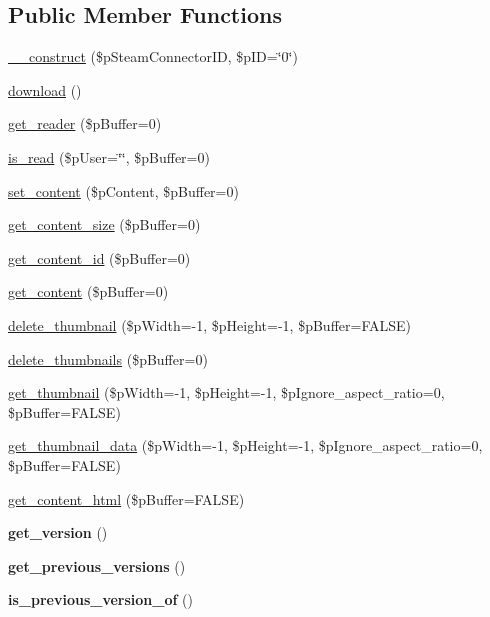 \subsection*{Public Member Functions}
\begin{DoxyCompactItemize}
\item 
\hyperlink{classsteam__document_adf7fde585fe05a10db6eb9c152393845}{\_\-\_\-construct} (\$pSteamConnectorID, \$pID=\char`\"{}0\char`\"{})
\item 
\hyperlink{classsteam__document_a228863fb04cd7019677e0a1bf0983bb6}{download} ()
\item 
\hyperlink{classsteam__document_a62bdda31edef4204fe27a6e059ea2d7e}{get\_\-reader} (\$pBuffer=0)
\item 
\hyperlink{classsteam__document_a73814559c902349a8ab4d7eb02f6e665}{is\_\-read} (\$pUser=\char`\"{}\char`\"{}, \$pBuffer=0)
\item 
\hyperlink{classsteam__document_afe13100bfd3690a32bdc6b0e81a84161}{set\_\-content} (\$pContent, \$pBuffer=0)
\item 
\hyperlink{classsteam__document_a50f7cd826e0d1d1e1f71b38a341aad67}{get\_\-content\_\-size} (\$pBuffer=0)
\item 
\hyperlink{classsteam__document_acf4d47307f5e529b90c1e582b567f2d7}{get\_\-content\_\-id} (\$pBuffer=0)
\item 
\hyperlink{classsteam__document_a0a4d0705058d71ef2893a768b6d32651}{get\_\-content} (\$pBuffer=0)
\item 
\hyperlink{classsteam__document_aad177fc6f0c2f88caecb7e7de3a8234b}{delete\_\-thumbnail} (\$pWidth=-\/1, \$pHeight=-\/1, \$pBuffer=FALSE)
\item 
\hyperlink{classsteam__document_aa068941435fc933eba125357e5a6dc7f}{delete\_\-thumbnails} (\$pBuffer=0)
\item 
\hyperlink{classsteam__document_a6a6f1c85184b188b41dc1243ceab2633}{get\_\-thumbnail} (\$pWidth=-\/1, \$pHeight=-\/1, \$pIgnore\_\-aspect\_\-ratio=0, \$pBuffer=FALSE)
\item 
\hyperlink{classsteam__document_a748704a2f4de5622551710cb198db7ce}{get\_\-thumbnail\_\-data} (\$pWidth=-\/1, \$pHeight=-\/1, \$pIgnore\_\-aspect\_\-ratio=0, \$pBuffer=FALSE)
\item 
\hyperlink{classsteam__document_aa5b946395d07bfe5f1ae9c7782ea8486}{get\_\-content\_\-html} (\$pBuffer=FALSE)
\item 
\hypertarget{classsteam__document_ac11b7c69c9dee2c1327840471979f8f4}{
{\bfseries get\_\-version} ()}
\label{classsteam__document_ac11b7c69c9dee2c1327840471979f8f4}

\item 
\hypertarget{classsteam__document_a99578da87fb100a930cc329ddbb51032}{
{\bfseries get\_\-previous\_\-versions} ()}
\label{classsteam__document_a99578da87fb100a930cc329ddbb51032}

\item 
\hypertarget{classsteam__document_aa7f4ce0d649867cacba7f97699b7732c}{
{\bfseries is\_\-previous\_\-version\_\-of} ()}
\label{classsteam__document_aa7f4ce0d649867cacba7f97699b7732c}

\end{DoxyCompactItemize}


